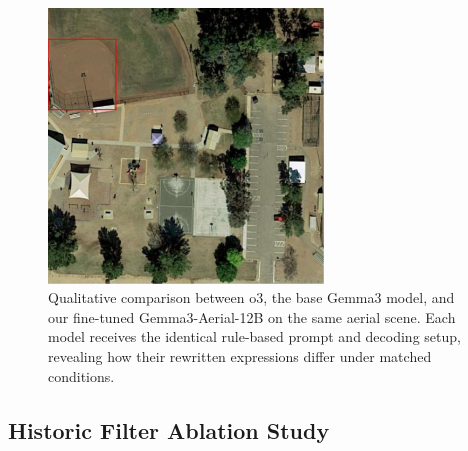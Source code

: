 \begin{figure}[t]
\centering
\begin{minipage}{0.5\textwidth}
\centering
\includegraphics[width=0.65\textwidth]{./images/3llm.png}
\end{minipage}%
\begin{minipage}{0.5\textwidth}
\centering
\hspace{-1cm}
\end{minipage}
\caption{Qualitative comparison between o3, the base Gemma3 model, and our fine-tuned Gemma3-Aerial-12B on the same aerial scene. Each model receives the identical rule-based prompt and decoding setup, revealing how their rewritten expressions differ under matched conditions.}
\label{fig:distillation_comparison}
\end{figure}


\subsection{Historic Filter Ablation Study}
\label{subsec:historic_ablation}

